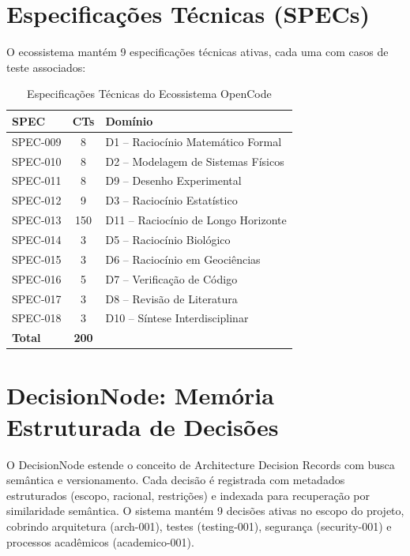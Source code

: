 \documentclass[12pt,a4paper,sumario=tradicional]{abntex2}
\begin{document}
\section{Especificações Técnicas (SPECs)}

O ecossistema mantém 9 especificações técnicas ativas, cada uma com casos de teste associados:

\begin{table}[H]
\centering
\caption{Especificações Técnicas do Ecossistema OpenCode}
\label{tab:specs}
\begin{tabular}{@{}lcp{4cm}@{}}
\toprule
\textbf{SPEC} & \textbf{CTs} & \textbf{Domínio} \\
\midrule
SPEC-009 & 8  & D1 -- Raciocínio Matemático Formal \\
SPEC-010 & 8  & D2 -- Modelagem de Sistemas Físicos \\
SPEC-011 & 8  & D9 -- Desenho Experimental \\
SPEC-012 & 9  & D3 -- Raciocínio Estatístico \\
SPEC-013 & 150 & D11 -- Raciocínio de Longo Horizonte \\
SPEC-014 & 3  & D5 -- Raciocínio Biológico \\
SPEC-015 & 3  & D6 -- Raciocínio em Geociências \\
SPEC-016 & 5  & D7 -- Verificação de Código \\
SPEC-017 & 3  & D8 -- Revisão de Literatura \\
SPEC-018 & 3  & D10 -- Síntese Interdisciplinar \\
\midrule
\textbf{Total} & \textbf{200} & \\
\bottomrule
\end{tabular}
\end{table}

\section{DecisionNode: Memória Estruturada de Decisões}

O DecisionNode estende o conceito de Architecture Decision Records \cite{kruchten2009documentation} com busca semântica e versionamento. Cada decisão é registrada com metadados estruturados (escopo, racional, restrições) e indexada para recuperação por similaridade semântica. O sistema mantém 9 decisões ativas no escopo do projeto, cobrindo arquitetura (arch-001), testes (testing-001), segurança (security-001) e processos acadêmicos (academico-001).
\end{document}
